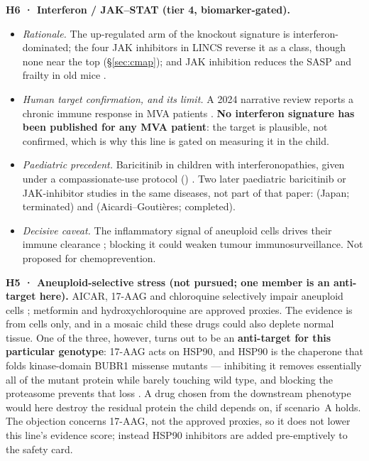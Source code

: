 \documentclass[10pt]{article}
\begin{document}
\textbf{H6 · Interferon / JAK–STAT (tier 4, biomarker-gated).}
\begin{itemize}
\item \textit{Rationale.} The up-regulated arm of the knockout signature is interferon-dominated; the four JAK inhibitors
  in LINCS reverse it as a class, though none near the top (§\ref{sec:cmap}); and JAK inhibition reduces the SASP
  and frailty in old mice \citep{xu}.
\item \textit{Human target confirmation, and its limit.} A 2024 narrative review reports a chronic immune response
  in MVA patients \citep{malumbres}. \textbf{No interferon signature has been published for any MVA patient}: the
  target is plausible, not confirmed, which is why this line is gated on measuring it in the child.
\item \textit{Paediatric precedent.} Baricitinib in children with interferonopathies, given under a compassionate-use
  protocol () \citep{sanchez}. Two later paediatric baricitinib or JAK-inhibitor studies in the same
  diseases, not part of that paper:  (Japan; terminated) and  (Aicardi--Goutières;
  completed).
\item \textit{Decisive caveat.} The inflammatory signal of aneuploid cells drives their immune clearance
  \citep{santaguida}; blocking it could weaken tumour immunosurveillance. Not proposed for chemoprevention.
\end{itemize}

\textbf{H5 · Aneuploid-selective stress (not pursued; one member is an anti-target here).}
\label{sec:h5}
AICAR, 17-AAG and chloroquine selectively impair aneuploid cells \citep{tang}; metformin and hydroxychloroquine
are approved proxies. The evidence is from cells only, and in a mosaic child these drugs could also deplete normal
tissue. One of the three, however, turns out to be an \textbf{anti-target for this particular genotype}: 17-AAG
acts on HSP90, and HSP90 is the chaperone that folds kinase-domain BUBR1 missense mutants --- inhibiting it
removes essentially all of the mutant protein while barely touching wild type, and blocking the proteasome
prevents that loss \citep{suij}. A drug chosen from the downstream phenotype would here destroy the residual
protein the child depends on, if scenario~A holds. The objection concerns 17-AAG, not the approved proxies, so it does not
lower this line's evidence score; instead HSP90 inhibitors are added pre-emptively to the safety card.
\end{document}
